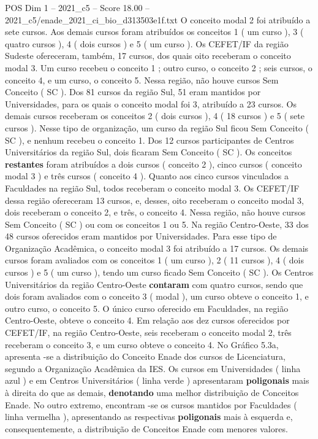 \begin{textsample}{POS Dim 1 – 2021\_c5 – Score 18.00 – 2021\_c5/enade\_2021\_ci\_bio\_d313503e1f.txt}
O conceito modal 2 foi atribuído a sete cursos.
Aos demais cursos foram atribuídos os conceitos 1 ( um curso ), 3 ( quatro cursos ), 4 ( dois cursos ) e 5 ( um curso ).
Os CEFET/IF da região Sudeste ofereceram, também, 17 cursos, dos quais oito receberam o conceito modal 3.
Um curso recebeu o conceito 1 ; outro curso, o conceito 2 ; seis cursos, o conceito 4, e um curso, o conceito 5.
Nessa região, não houve cursos Sem Conceito ( SC ).
Dos 81 cursos da região Sul, 51 eram mantidos por Universidades, para os quais o conceito modal foi 3, atribuído a 23 cursos.
Os demais cursos receberam os conceitos 2 ( dois cursos ), 4 ( 18 cursos ) e 5 ( sete cursos ).
Nesse tipo de organização, um curso da região Sul ficou Sem Conceito ( SC ), e nenhum recebeu o conceito 1.
Dos 12 cursos participantes de Centros Universitários da região Sul, dois ficaram Sem Conceito ( SC ).
Os conceitos \textbf{restantes} foram atribuídos a dois cursos ( conceito 2 ), cinco cursos ( conceito modal 3 ) e três cursos ( conceito 4 ).
Quanto aos cinco cursos vinculados a Faculdades na região Sul, todos receberam o conceito modal 3.
Os CEFET/IF dessa região ofereceram 13 cursos, e, desses, oito receberam o conceito modal 3, dois receberam o conceito 2, e três, o conceito 4.
Nessa região, não houve cursos Sem Conceito ( SC ) ou com os conceitos 1 ou 5.
Na região Centro-Oeste, 33 dos 48 cursos oferecidos eram mantidos por Universidades.
Para esse tipo de Organização Acadêmica, o conceito modal 3 foi atribuído a 17 cursos.
Os demais cursos foram avaliados com os conceitos 1 ( um curso ), 2 ( 11 cursos ), 4 ( dois cursos ) e 5 ( um curso ), tendo um curso ficado Sem Conceito ( SC ).
Os Centros Universitários da região Centro-Oeste \textbf{contaram} com quatro cursos, sendo que dois foram avaliados com o conceito 3 ( modal ), um curso obteve o conceito 1, e outro curso, o conceito 5.
O único curso oferecido em Faculdades, na região Centro-Oeste, obteve o conceito 4.
Em relação aos dez cursos oferecidos por CEFET/IF, na região Centro-Oeste, seis receberam o conceito modal 2, três receberam o conceito 3, e um curso obteve o conceito 4.
No Gráfico 5.3a, apresenta -se a distribuição do Conceito Enade dos cursos de Licenciatura, segundo a Organização Acadêmica da IES.
Os cursos em Universidades ( linha azul ) e em Centros Universitários ( linha verde ) apresentaram \textbf{poligonais} mais à direita do que as demais, \textbf{denotando} uma melhor distribuição de Conceitos Enade.
No outro extremo, encontram -se os cursos mantidos por Faculdades ( linha vermelha ), apresentando as respectivas \textbf{poligonais} mais à esquerda e, consequentemente, a distribuição de Conceitos Enade com menores valores.

\end{textsample}
